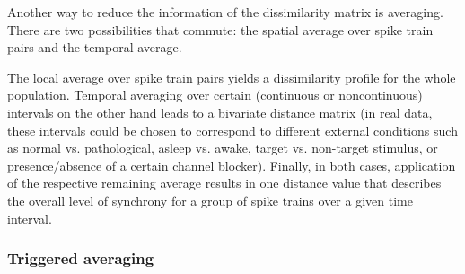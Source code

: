 \documentclass[10pt,twocolumn]{elsart5p}
\begin{document}
Another way to reduce the information of the dissimilarity matrix is averaging. There are two possibilities that commute: the spatial average over spike train pairs and the temporal average.

The local average over spike train pairs yields a dissimilarity profile for the whole population. Temporal averaging over certain (continuous or noncontinuous) intervals on the other hand leads to a bivariate distance matrix (in real data, these intervals could be chosen to correspond to different external conditions such as normal vs. pathological, asleep vs. awake, target vs. non-target stimulus, or presence/absence of a certain channel blocker). Finally, in both cases, application of the respective remaining average results in one distance value that describes the overall level of synchrony for a group of spike trains over a given time interval.

\subsubsection{\label{sss:Triggered-Averaging} Triggered averaging}
\end{document}

